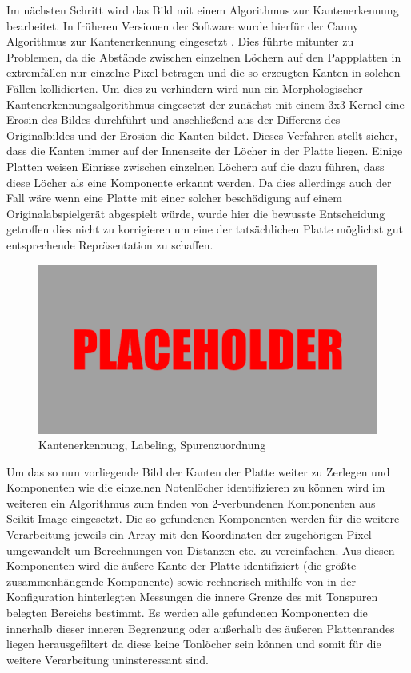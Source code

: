 Im nächsten Schritt wird das Bild mit einem Algorithmus zur Kantenerkennung bearbeitet.
In früheren Versionen der Software wurde hierfür der Canny Algorithmus zur Kantenerkennung eingesetzt \parencite[]{canny_1986}.
Dies führte mitunter zu Problemen, da die Abstände zwischen einzelnen Löchern auf den Pappplatten in extremfällen nur einzelne Pixel betragen und die so erzeugten Kanten in solchen Fällen kollidierten.
Um dies zu verhindern wird nun ein Morphologischer Kantenerkennungsalgorithmus eingesetzt der zunächst mit einem 3x3 Kernel eine Erosin des Bildes durchführt und anschließend aus der Differenz des Originalbildes und der Erosion die Kanten bildet.
Dieses Verfahren stellt sicher, dass die Kanten immer auf der Innenseite der Löcher in der Platte liegen.
Einige Platten weisen Einrisse zwischen einzelnen Löchern auf die dazu führen, dass diese Löcher als eine Komponente erkannt werden.
Da dies allerdings auch der Fall wäre wenn eine Platte mit einer solcher beschädigung auf einem Originalabspielgerät abgespielt würde, wurde hier die bewusste Entscheidung getroffen dies nicht zu korrigieren um eine der tatsächlichen Platte möglichst gut entsprechende Repräsentation zu schaffen. 

\begin{figure}[t]
    \centering
    \includegraphics[width=\textwidth]{graphics/placeholder.png}
    \caption{Kantenerkennung, Labeling, Spurenzuordnung}
    \label{pappplattenphotos}
\end{figure}

Um das so nun vorliegende Bild der Kanten der Platte weiter zu Zerlegen und Komponenten wie die einzelnen Notenlöcher identifizieren zu können wird im weiteren ein Algorithmus zum finden von 2-verbundenen Komponenten aus Scikit-Image \parencite[]{scikit-image} eingesetzt.
Die so gefundenen Komponenten werden für die weitere Verarbeitung jeweils ein Array mit den Koordinaten der zugehörigen Pixel umgewandelt um Berechnungen von Distanzen etc. zu vereinfachen.
Aus diesen Komponenten wird die äußere Kante der Platte identifiziert (die größte zusammenhängende Komponente) sowie rechnerisch mithilfe von in der Konfiguration hinterlegten Messungen die innere Grenze des mit Tonspuren belegten Bereichs bestimmt.
Es werden alle gefundenen Komponenten die innerhalb dieser inneren Begrenzung oder außerhalb des äußeren Plattenrandes liegen herausgefiltert da diese keine Tonlöcher sein können und somit für die weitere Verarbeitung uninsteressant sind.


